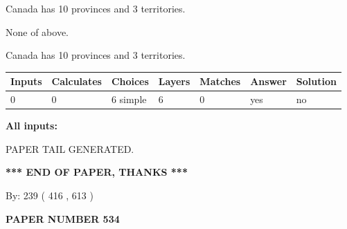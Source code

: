 \documentclass[12pt]{article}
\begin{document}
 
Canada has 10  provinces and 3 territories.
 
 
 None of above.
 
 
\noindent{}
 
 
Canada has 10  provinces and 3 territories.
 
 
\noindent{}
 
 
   
   
   
   
\noindent\begin{tabular}{|l|l|l|l|l|l|l|}
 \hline
Inputs & Calculates & Choices & Layers & Matches & Answer & Solution \\ \hline
 0  & 
 0  & 
 6
  simple  
  & 
 6  & 
 0  & 
  yes & 
  no 
  \\ \hline
 \end{tabular}
   
   
   
   
\noindent{}
   
   
   
   
\noindent\vspace{0.1in}\hspace{-0.08in} {\textbf{\Large{All inputs: }}}
   
   
   
   
   
   
 \vspace{0.2in}
 
   
   
\vspace{2.0in} PAPER TAIL GENERATED.
   
   
   
   
\vspace{1.0in} 
{\textbf{\large{ *** END OF PAPER, THANKS *** }}} 
   
   
\hspace{1.0in} By: 
 239 ( 416 ,  613 )
   
   
   
   
\newpage 
\setcounter{page}{ 
   534001 } 
   
   
   
   
 {\textbf{ \Large{ PAPER NUMBER  534  }}}
   
\end{document}

